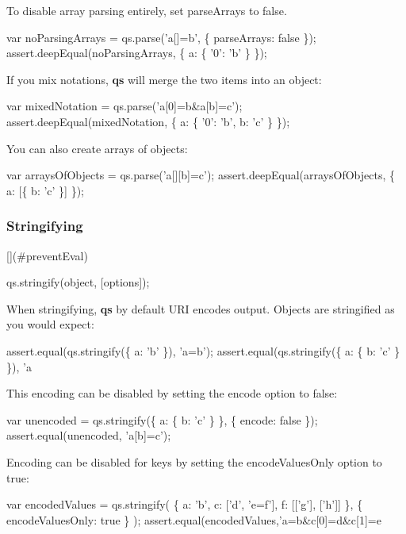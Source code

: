 To disable array parsing entirely, set {\ttfamily parse\+Arrays} to {\ttfamily false}.


\begin{DoxyCode}
var noParsingArrays = qs.parse('a[]=b', \{ parseArrays: false \});
assert.deepEqual(noParsingArrays, \{ a: \{ '0': 'b' \} \});
\end{DoxyCode}


If you mix notations, {\bfseries qs} will merge the two items into an object\+:


\begin{DoxyCode}
var mixedNotation = qs.parse('a[0]=b&a[b]=c');
assert.deepEqual(mixedNotation, \{ a: \{ '0': 'b', b: 'c' \} \});
\end{DoxyCode}


You can also create arrays of objects\+:


\begin{DoxyCode}
var arraysOfObjects = qs.parse('a[][b]=c');
assert.deepEqual(arraysOfObjects, \{ a: [\{ b: 'c' \}] \});
\end{DoxyCode}


\subsubsection*{Stringifying}

\mbox{[}\mbox{]}(\#prevent\+Eval) 
\begin{DoxyCode}
qs.stringify(object, [options]);
\end{DoxyCode}


When stringifying, {\bfseries qs} by default U\+RI encodes output. Objects are stringified as you would expect\+:


\begin{DoxyCode}
assert.equal(qs.stringify(\{ a: 'b' \}), 'a=b');
assert.equal(qs.stringify(\{ a: \{ b: 'c' \} \}), 'a%
\end{DoxyCode}


This encoding can be disabled by setting the {\ttfamily encode} option to {\ttfamily false}\+:


\begin{DoxyCode}
var unencoded = qs.stringify(\{ a: \{ b: 'c' \} \}, \{ encode: false \});
assert.equal(unencoded, 'a[b]=c');
\end{DoxyCode}


Encoding can be disabled for keys by setting the {\ttfamily encode\+Values\+Only} option to {\ttfamily true}\+: 
\begin{DoxyCode}
var encodedValues = qs.stringify(
    \{ a: 'b', c: ['d', 'e=f'], f: [['g'], ['h']] \},
    \{ encodeValuesOnly: true \}
);
assert.equal(encodedValues,'a=b&c[0]=d&c[1]=e%
\end{DoxyCode}


